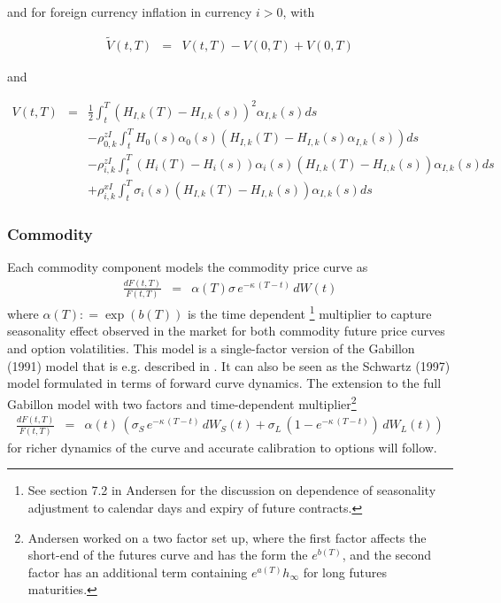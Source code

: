 and for foreign currency inflation in currency $i>0$, with

\begin{eqnarray*}
  \tilde{V}(t,T) &=& V(t,T) -V(0,T) + V(0,T)
\end{eqnarray*}

and

\begin{eqnarray*}
  V(t,T) &=& \frac{1}{2}\int_t^T (H_{I,k}(T)-H_{I,k}(s))^2 \alpha_{I,k}(s) ds \\
  & & -\rho^{zI}_{0,k} \int_t^T H_0(s)\alpha_0(s)(H_{I,k}(T)-H_{I,k}(s)\alpha_{I,k}(s)) ds \\
  & & -\rho^{zI}_{i,k} \int_t^T (H_i(T)-H_i(s))\alpha_i(s)(H_{I,k}(T)-H_{I,k}(s))\alpha_{I,k}(s) ds \\
  & & +\rho^{xI}_{i,k} \int_t^T \sigma_i(s)(H_{I,k}(T)-H_{I,k}(s))\alpha_{I,k}(s) ds
\end{eqnarray*}

\subsubsection*{Commodity}

Each commodity component models the commodity price curve as 
\begin{eqnarray}
\frac{dF(t,T)}{F(t,T)} &=& \alpha(T) \sigma\,e^{-\kappa\,(T-t)}\, dW(t)  \label{gabillon1f}
\end{eqnarray}
where $\alpha(T) : = \exp( b(T)) $ is the time dependent \footnote{See section 7.2 in Andersen \cite{Andersen_2008} for the discussion on dependence of seasonality adjustment to calendar days and expiry of future contracts.} multiplier to capture seasonality effect observed in the market for both commodity future price curves and option volatilities. This model is a single-factor version of the Gabillon (1991) model that is e.g. described in \cite{Lichters}. It can also be seen as the Schwartz (1997) model formulated in terms of forward curve dynamics. The extension to the full Gabillon model with two factors and time-dependent multiplier\footnote{Andersen \cite{Andersen_2008} worked on a two factor set up, where the first factor affects the short-end of the futures curve and has the form the $e^{b(T)}$, and the second factor has an additional term containing $e^{a(T)}h_{\infty}$ for long futures maturities.} 
\begin{eqnarray}
\frac{dF(t,T)}{F(t,T)} &=& \alpha(t)\,
\left( \sigma_S \,e^{-\kappa\,(T-t)}\, dW_S(t) + \sigma_L\,\left(1-e^{-\kappa\,(T-t)}\right)\,dW_L(t)\right) \label{gabillon2f}
\end{eqnarray}
for richer dynamics of the curve and accurate calibration to options will follow. 

